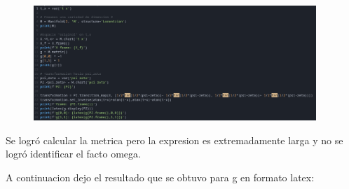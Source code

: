 \documentclass{article}
\begin{document}
\begin{figure}[H]
  \begin{center}
    \includegraphics[width=0.95\textwidth]{codigo.png}
  \end{center}
\end{figure}

Se logró calcular la metrica pero la expresion es extremadamente larga y no se logró identificar el facto omega.

A continuacion dejo el resultado que se obtuvo para g en formato latex: 
\end{document}

